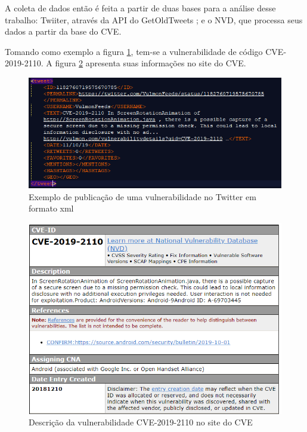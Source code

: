 A coleta de dados então é feita a partir de duas bases para a análise desse trabalho: Twiiter, através da API do GetOldTweets \cite{Pythoncommunity}; e o NVD, que processa seus dados a partir da base do CVE.

Tomando como exemplo a figura \ref{fig:exemploVulnerabilidade}, tem-se a vulnerabilidade de código CVE-2019-2110. A figura \ref{fig:exemploVulnerabilidadeCVE} apresenta suas informações no site do CVE.

\begin{figure}[H]
\centering
\includegraphics[width=1\textwidth]{imagens/exemploVulnerabilidade.png}
\caption{Exemplo de publicação de uma vulnerabilidade no Twitter em formato xml}
\label{fig:exemploVulnerabilidade}
\end{figure}

\begin{figure}[H]
\centering
\includegraphics[width=1\textwidth]{imagens/exemploVulnerabilidadeCVE.png}
\caption{Descrição da vulnerabilidade CVE-2019-2110 no site do CVE \cite{CVE1985}}
\label{fig:exemploVulnerabilidadeCVE}
\end{figure}

